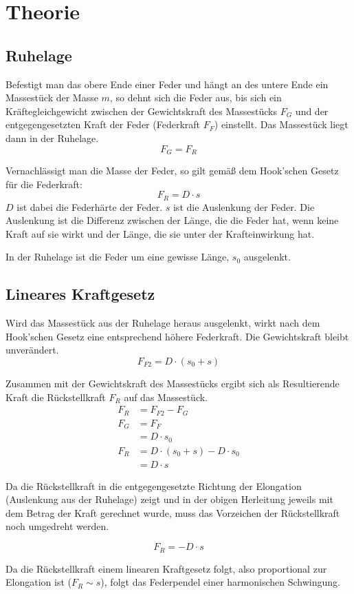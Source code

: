 \chapter{Theorie}
\section{Ruhelage}
Befestigt man das obere Ende einer Feder und hängt an des untere Ende ein Massestück der Masse $m$, so dehnt sich die Feder aus, bis sich ein Kräftegleichgewicht zwischen der Gewichtskraft des Massestücks $F_G$ und der entgegengesetzten Kraft der Feder (Federkraft $F_F$) einstellt. Das Massestück liegt dann in der Ruhelage.
$$F_G = F_R $$

Vernachlässigt man die Masse der Feder, so gilt gemäß dem Hook'schen Gesetz für die Federkraft:
$$F_R = D \cdot s$$
$D$ ist dabei die Federhärte der Feder.
$s$ ist die Auslenkung der Feder. Die Auslenkung ist die Differenz zwischen der Länge, die die Feder hat, wenn keine Kraft auf sie wirkt und der Länge, die sie unter der Krafteinwirkung hat.

In der Ruhelage ist die Feder um eine gewisse Länge, $s_0$ ausgelenkt.

\section{Lineares Kraftgesetz}
Wird das Massestück aus der Ruhelage heraus ausgelenkt, wirkt nach dem Hook'schen Gesetz eine entsprechend höhere Federkraft. Die Gewichtskraft bleibt unverändert.
$$F_{F2} = D \cdot (s_0 + s)$$

Zusammen mit der Gewichtskraft des Massestücks ergibt sich als Resultierende Kraft die Rückstellkraft $F_R$ auf das Massestück.
\begin{align*}
F_R &= F_{F2} - F_G \\
F_G &= F_F \\
    &= D \cdot s_0 \\
F_R &= D \cdot (s_0 + s) - D \cdot s_0 \\
    &= D \cdot s
\end{align*}

Da die Rückstellkraft in die entgegengesetzte Richtung der Elongation (Auslenkung aus der Ruhelage) zeigt und in der obigen Herleitung jeweils mit dem Betrag der Kraft gerechnet wurde, muss das Vorzeichen der Rückstellkraft noch umgedreht werden.

$$F_R = -D \cdot s$$

Da die Rückstellkraft einem linearen Kraftgesetz folgt, also proportional zur Elongation ist ($F_R \sim s$), folgt das Federpendel einer harmonischen Schwingung.

